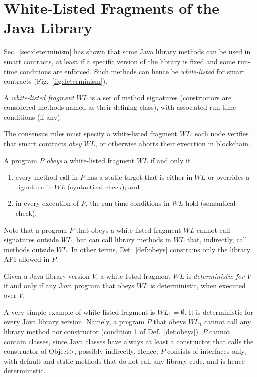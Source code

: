 \section{White-Listed Fragments of the Java Library}\label{sec:white_listing}

\newcommand{\wl}{\mathit{WL}}

Sec.~\ref{sec:determinism} has shown that some Java library methods can be used
in smart contracts, at least if a specific version of the library is fixed and some
run-time conditions are enforced. Such methods can hence be \emph{white-listed} for smart contracts
(Fig.~\ref{fig:determinism}).

\begin{definition}\label{def:white-listing}
  A \emph{white-listed fragment} $\wl$ is a set of method signatures (constructors are considered
  methods named as their defining class), with associated run-time conditions (if any).
\end{definition}
%
The consensus rules must specify a white-listed fragment $\wl$:
each node verifies that smart contracts \emph{obey} $\wl$,
or otherwise aborts their execution in blockchain.
%
\begin{definition}\label{def:obeys}
  A program $P$ \emph{obeys} a white-listed fragment $\wl$ if and only if
  \begin{enumerate}
    \item every method call
      in $P$ has a static target that is either in $\wl$ or overrides a signature in $\wl$
      (syntactical check); and
    \item in every execution of $P$, the run-time conditions in $\wl$ hold (semantical check).
  \end{enumerate}
\end{definition}
%
Note that a program $P$ that obeys a white-listed fragment $\wl$ cannot call signatures outside
$\wl$, but can call library methods in $\wl$ that, indirectly, call methods outside $\wl$.
In other terms, Def.~\ref{def:obeys} constrains only the library API allowed in $P$.
%
\begin{definition}\label{def:deterministic}
  Given a Java library version $V$, a white-listed fragment $\wl$ is
  \emph{deterministic for $V$}
  if and only if any Java program that obeys $\wl$
  is deterministic, when executed over $V$.
\end{definition}

A very simple example of white-listed fragment is
$\wl_1=\emptyset$. It is deterministic for every Java library version.
Namely, a program $P$ that obeys $\wl_1$ cannot call any library method nor constructor
(condition 1 of Def.~\ref{def:obeys}). $P$ cannot contain classes, since Java classes
have always at least a constructor that calls the constructor of \<Object>, possibly
indirectly. Hence, $P$ consists of interfaces only,
with default and static methods that do not call any library code, and is hence
deterministic.


